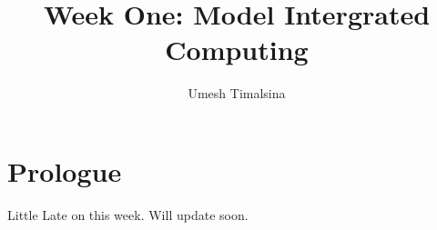 \documentclass[12pt]{article}
\title{Week One: Model Intergrated Computing}
\author{Umesh Timalsina}
\begin{document}
    \maketitle
    \section*{Prologue}
      Little Late on this week.
      Will update soon.
\end{document}
